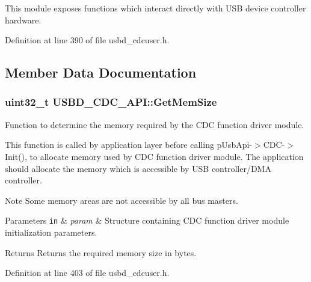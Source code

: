 This module exposes functions which interact directly with U\+SB device controller hardware. 



Definition at line 390 of file usbd\+\_\+cdcuser.\+h.



\subsection{Member Data Documentation}
\subsubsection[{\texorpdfstring{Get\+Mem\+Size}{GetMemSize}}]{\setlength{\rightskip}{0pt plus 5cm}uint32\+\_\+t U\+S\+B\+D\+\_\+\+C\+D\+C\+\_\+\+A\+P\+I\+::\+Get\+Mem\+Size}\hypertarget{structUSBD__CDC__API_abde21c25f0b02b4d3ec9af0e41378437}{}\label{structUSBD__CDC__API_abde21c25f0b02b4d3ec9af0e41378437}
Function to determine the memory required by the C\+DC function driver module.

This function is called by application layer before calling p\+Usb\+Api-\/$>$C\+D\+C-\/$>$Init(), to allocate memory used by C\+DC function driver module. The application should allocate the memory which is accessible by U\+SB controller/\+D\+MA controller. \begin{DoxyNote}{Note}
Some memory areas are not accessible by all bus masters.
\end{DoxyNote}

\begin{DoxyParams}[1]{Parameters}
\mbox{\tt in}  & {\em param} & Structure containing C\+DC function driver module initialization parameters. \\
\hline
\end{DoxyParams}
\begin{DoxyReturn}{Returns}
Returns the required memory size in bytes. 
\end{DoxyReturn}


Definition at line 403 of file usbd\+\_\+cdcuser.\+h.

